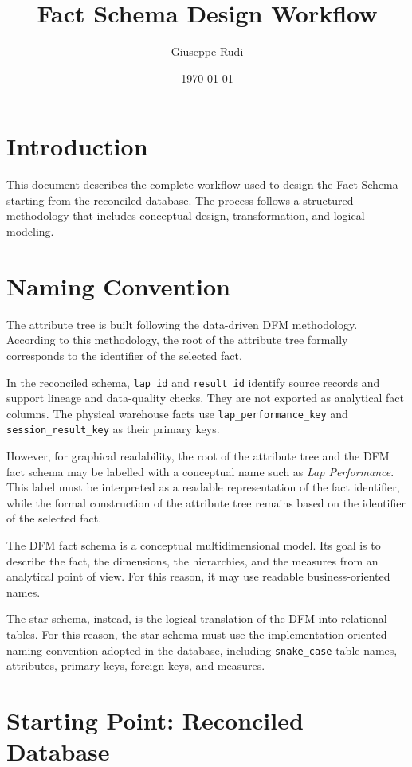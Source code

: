 \documentclass[a4paper,11pt]{article}
\title{Fact Schema Design Workflow}
\author{Giuseppe Rudi}
\date{\today}
\begin{document}
	
	\maketitle
	
	\section{Introduction}
	
	This document describes the complete workflow used to design the Fact Schema starting from the reconciled database.
	The process follows a structured methodology that includes conceptual design, transformation, and logical modeling.
	

	\section{Naming Convention}
	
	The attribute tree is built following the data-driven DFM methodology.
	According to this methodology, the root of the attribute tree formally corresponds to the
	identifier of the selected fact.
	
	In the reconciled schema, \texttt{lap\_id} and \texttt{result\_id} identify source
	records and support lineage and data-quality checks. They are not exported as analytical
	fact columns. The physical warehouse facts use \texttt{lap\_performance\_key} and
	\texttt{session\_result\_key} as their primary keys.
	
	However, for graphical readability, the root of the attribute tree and the DFM fact schema
	may be labelled with a conceptual name such as  \textit{Lap Performance}.
	This label must be interpreted as a readable representation of the fact identifier, while the
	formal construction of the attribute tree remains based on the identifier of the selected
	fact.
	
	
	The DFM fact schema is a conceptual multidimensional model. Its goal is to describe the
	fact, the dimensions, the hierarchies, and the measures from an analytical point of view.
	For this reason, it may use readable business-oriented names.
	
	The star schema, instead, is the logical translation of the DFM into relational tables.
	For this reason, the star schema must use the implementation-oriented naming convention
	adopted in the database, including \texttt{snake\_case} table names, attributes, primary keys,
	foreign keys, and measures.
	
	\section{Starting Point: Reconciled Database}
	
\end{document}
